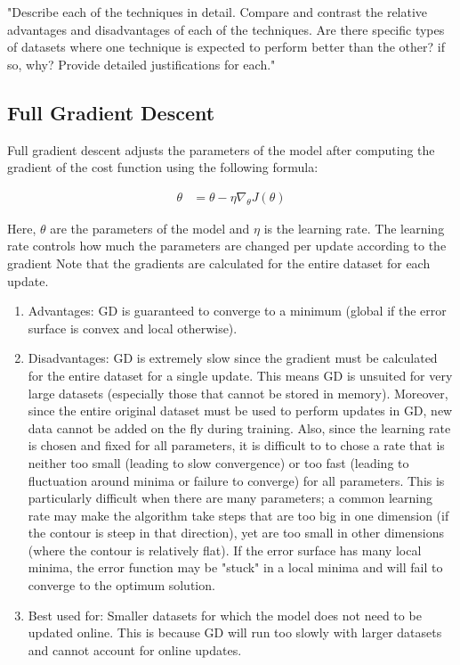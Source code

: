 \documentclass[twoside,11pt]{homework}
\begin{document}
"Describe each of the techniques in detail. Compare and contrast the relative advantages and
disadvantages of each of the techniques. Are there specific types of datasets where one technique is expected to perform better than the other? if so, why? Provide detailed justifications
for each."
\subsection*{Full Gradient Descent}
Full gradient descent adjusts the parameters of the model after computing the gradient of the cost function using the following formula:

\begin{align*}
	\theta &= \theta - \eta \nabla_\theta J(\theta)
\end{align*}

Here, $\theta$ are the parameters of the model and $\eta$ is the learning rate. The learning rate controls how much the parameters are changed per update according to the gradient Note that the gradients are calculated for the entire dataset for each update.

\begin{enumerate}
	\item Advantages: GD is guaranteed to converge to a minimum (global if the error surface is convex and local otherwise).
	\item Disadvantages: GD is extremely slow since the gradient must be calculated for the entire dataset for a single update. This means GD is unsuited for very large datasets (especially those that cannot be stored in memory). Moreover, since the entire original dataset must be used to perform updates in GD, new data cannot be added on the fly during training. Also, since the learning rate is chosen and fixed for all parameters, it is difficult to to chose a rate that is neither too small (leading to slow convergence) or too fast (leading to fluctuation around minima or failure to converge) for all parameters. This is particularly difficult when there are many parameters; a common learning rate may make the algorithm take steps that are too big in one dimension (if the contour is steep in that direction), yet are too small in other dimensions (where the contour is relatively flat). If the error surface has many local minima, the error function may be "stuck" in a local minima and will fail to converge to the optimum solution.
	\item Best used for: Smaller datasets for which the model does not need to be updated online. This is because GD will run too slowly with larger datasets and cannot account for online updates.
\end{enumerate}
\end{document}
